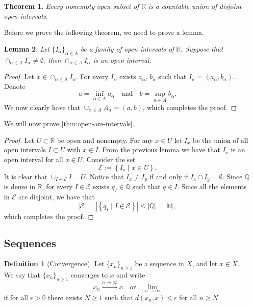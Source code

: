 \documentclass[11pt,a4paper]{article}
\theoremstyle{definition}
\newtheorem{definition}{Definition}[section]
\theoremstyle{plain}
\newtheorem{theorem}{Theorem}[section]
\newtheorem{lemma}[theorem]{Lemma}
\newcommand{\N}{\mathbb{N}}
\newcommand{\Q}{\mathbb{Q}}
\newcommand{\R}{\mathbb{R}}
\newcommand{\set}[2]{ \left\{ #1 \mid #2 \right\} }
\newcommand{\abs}[1]{\left\lvert #1\right\rvert}
\begin{document}
  \begin{theorem}\label{thm:open-are-intervals}
    Every nonempty open subset of $\R$ is a countable union of disjoint
    open intervals.
  \end{theorem}
  Before we prove the following theorem, we need to prove a lemma.
  \begin{lemma}
    Let $\{I_\alpha\}_{\alpha \in A}$ be a family of open intervals of $\R$.
    Suppose that $\cap_{\alpha \in A} I_\alpha \neq \emptyset$, then 
    $\cap_{\alpha \in A} I_\alpha$ is an open interval.
  \end{lemma}
  \begin{proof}
    Let $x \in \cap_{\alpha \in A} I_\alpha$. For every $I_\alpha$ exists 
    $a_\alpha$, $b_\alpha$ such that $I_\alpha = (a_\alpha,b_\alpha)$.
    Denote
    \[
      a = \inf_{\alpha \in A} a_\alpha \quad \text{and} \quad
      b = \sup_{\alpha \in A} b_\alpha.
    \]
    We now clearly have that $\cup_{\alpha \in A} A_\alpha = (a,b)$, 
    which completes the proof.
  \end{proof}
  We will now prove \autoref{thm:open-are-intervals}.
  \begin{proof}
    Let $U \subset \R$ be open and nonempty.
    For any $x \in U$ let $I_x$ be the union of all open intervals $I \subset U$
    with $x \in I$.
    From the previous lemma we have that $I_x$ is an open interval for all
    $x \in U$. Consider the set
    \[
      \mathcal{E} := \set{I_x}{x \in U}.
    \]
    It is clear that $\cup_{I \in \mathcal E} I = U$.
    Notice that $I_x \neq I_y$ if and only if $I_x \cap I_y = \emptyset$.
    Since $\Q$ is dense in $\R$, for every $I \in \mathcal E$ exists 
    $q_I \in \Q$ such that $q \in I$. Since all the elements in $\mathcal E$
    are disjoint, we have that
    \[
      \abs{\mathcal E} =
      \abs{\set{q_I}{I \in \mathcal E}} \le
      \abs{\Q} =
      \abs{\N},
    \]
    which completes the proof.
  \end{proof}
  
  \subsection{Sequences}

  \begin{definition}[Convergence]
    Let $\{x_n\}_{n \geq 1}$ be a sequence in $X$, and let $x \in X$.
    We say that $\{x_n\}_{n \geq 1}$ converges to $x$ and write
    \[
      x_n \xrightarrow{n \to \infty} x \quad \text{or} \quad \lim_{n \to \infty}
    \]
    if for all $\epsilon > 0$ there exists $N \geq 1$ such that
    $d(x_n,x) \le \epsilon$ for all $n \geq N$.
  \end{definition}
\end{document}

